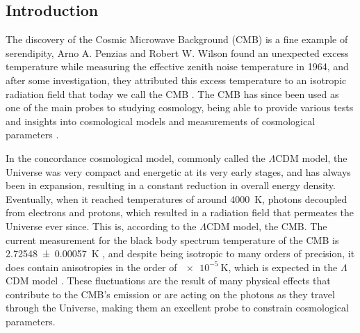 \documentclass[openany,a4paper,12pt,oneside]{book}
\begin{document}
\cleardoublepage
{}

\begingroup
{}
\begin{spacing}{1.5}
\setlength{\abovedisplayskip}{0.01cm}
\setlength{\abovedisplayshortskip}{0.01cm}

\chapter{Introduction}

The discovery of the Cosmic Microwave Background (CMB) is a fine example of serendipity, Arno A. Penzias and Robert W. Wilson found an unexpected excess temperature while measuring the effective zenith noise temperature in 1964, and after some investigation, they attributed this excess temperature to an isotropic radiation field that today we call the CMB \cite{1965CMB_discovery}. The CMB has since been used as one of the main probes to studying cosmology, being able to provide various tests and insights into cosmological models \cite{Large_scale_anomalies, nongaussianity_inflation, rees_sciama_effect} and measurements of cosmological parameters \cite{WMAP_results, Planck_results}. 

In the concordance cosmological model, commonly called the $\Lambda$CDM model, the Universe was very compact and energetic at its very early stages, and has always been in expansion, resulting in a constant reduction in overall energy density. Eventually, when it reached temperatures of around \SI{4000}{\kelvin}, photons decoupled from electrons and protons, which resulted in a radiation field that permeates the Universe ever since. This is, according to the $\Lambda$CDM model, the CMB\cite{CMB_physical_explanation}. The current measurement for the black body spectrum temperature of the CMB is \SI{2.72548 \pm 0.00057}{\kelvin} \cite{CMB_temperature:Fixsen_2009}, and despite being isotropic to many orders of precision, it does contain anisotropies in the order of $\SI{e-5}{\kelvin}$, which is expected in the $\Lambda$CDM model \cite{CMB_analytical_anisotropies}. These fluctuations are the result of many physical effects that contribute to the CMB's emission or are acting on the photons as they travel through the Universe, making them an excellent probe to constrain cosmological parameters.


\end{spacing}
\end{document}

